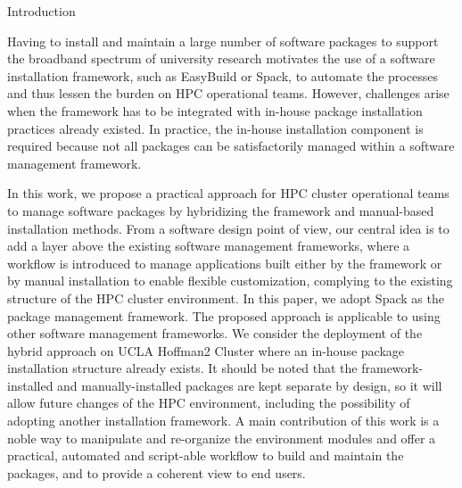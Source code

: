 \documentclass[final]{beamer}
\newlength{\onecolwid}
\begin{document}
\begin{frame}[t]
\begin{columns}[t]
\begin{column}{\onecolwid}
\begin{block}{Introduction}

\hspace{2em}Having to install and maintain a large number of software packages to support the broadband spectrum of university research motivates the use of a software installation framework, such as EasyBuild\cite{geimer:14} or Spack\cite{gamblin:15}, to automate the processes and thus lessen the burden on HPC operational teams. 
However, challenges arise when the framework has to be integrated with in-house package installation practices already existed. In practice, the in-house installation component is required because not all packages can be satisfactorily managed within a software management framework.

\hspace{2em}In this work, we propose a practical approach for HPC cluster operational teams to manage software packages by hybridizing the framework and manual-based installation methods. 
From a software design point of view, our central idea is to add a layer above the existing software management frameworks, where a workflow is introduced to manage applications built either by the framework or by manual installation to enable flexible customization, complying to the existing structure of the HPC cluster environment.
In this paper, we adopt Spack as the package management framework. The proposed approach is applicable to using other software management frameworks. We consider the deployment of the hybrid approach on UCLA Hoffman2 Cluster where an in-house package installation structure already exists.
It should be noted that the framework-installed and manually-installed packages are kept separate by design, so it will allow future changes of the HPC environment, including the possibility of adopting another installation framework.
A main contribution of this work is a noble way to manipulate and re-organize the environment modules and offer a practical, automated and script-able workflow to build and maintain the packages, and to provide a coherent view to end users.

\end{block}





\end{column}
\end{columns}
\end{frame}
\end{document}
